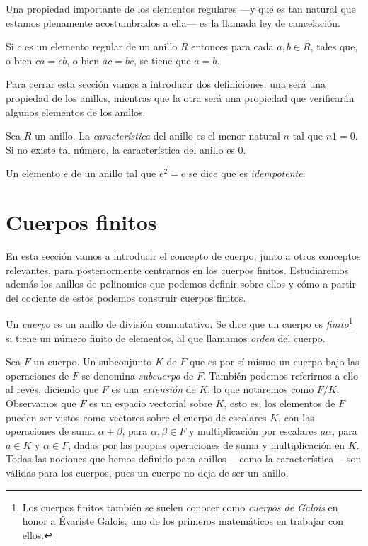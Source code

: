Una propiedad importante de los elementos regulares —y que es tan natural que estamos plenamente acostumbrados a ella— es la llamada ley de cancelación.
\begin{proposition}
  Si \(c\) es un elemento regular de un anillo \(R\) entonces para cada \(a, b \in R\), tales que, o bien \(ca = cb\), o bien \(ac = bc\), se tiene que \(a = b\).
\end{proposition}

Para cerrar esta sección vamos a introducir dos definiciones: una será una propiedad de los anillos, mientras que la otra será una propiedad que verificarán algunos elementos de los anillos.

\begin{definition}
  Sea \(R\) un anillo. La \textit{característica} del anillo es el menor natural \(n\) tal que \(n1 = 0\).
  Si no existe tal número, la característica del anillo es \(0\).  
\end{definition}

\begin{definition}
  Un elemento \(e\) de un anillo tal que \(e^2 = e\) se dice que es \textit{idempotente}.
\end{definition}

\section{Cuerpos finitos}

En esta sección vamos a introducir el concepto de cuerpo, junto a otros conceptos relevantes, para posteriormente centrarnos en los cuerpos finitos.
Estudiaremos además los anillos de polinomios que podemos definir sobre ellos y cómo a partir del cociente de estos podemos construir cuerpos finitos.

\begin{definition}
  Un \textit{cuerpo} es un anillo de división conmutativo.
  Se dice que un cuerpo es \textit{finito}\footnote{Los cuerpos finitos también se suelen conocer como \textit{cuerpos de Galois} en honor a Évariste Galois, uno de los primeros matemáticos en trabajar con ellos.} si tiene un número finito de elementos, al que llamamos \textit{orden} del cuerpo.
\end{definition}


Sea \(F\) un cuerpo. Un subconjunto \(K\) de \(F\) que es por sí mismo un cuerpo bajo las operaciones de \(F\) se denomina \textit{subcuerpo} de \(F\).
También podemos referirnos a ello al revés, diciendo que \(F\) es una \textit{extensión} de \(K\), lo que notaremos como \(F/K\).
Observamos que \(F\) es un espacio vectorial sobre \(K\), esto es, los elementos de \(F\) pueden ser vistos como vectores sobre el cuerpo de escalares \(K\), con las operaciones de suma \(\alpha + \beta\), para \(\alpha, \beta \in F\) y multiplicación por escalares \(a\alpha\), para \(a \in K\) y \(\alpha \in F\), dadas por las propias operaciones de suma y multiplicación en \(K\).
Todas las nociones que hemos definido para anillos —como la característica— son válidas para los cuerpos, pues un cuerpo no deja de ser un anillo.

